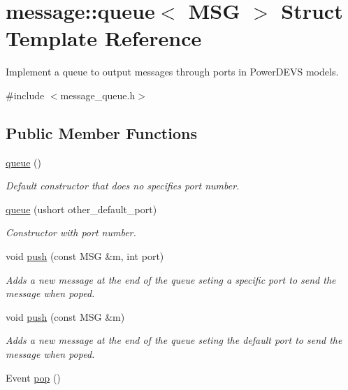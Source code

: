 \hypertarget{classmessage_1_1queue}{}\section{message\+:\+:queue$<$ M\+SG $>$ Struct Template Reference}
\label{classmessage_1_1queue}


Implement a queue to output messages through ports in Power\+D\+E\+VS models.  




{\ttfamily \#include $<$message\+\_\+queue.\+h$>$}

\subsection*{Public Member Functions}
\begin{DoxyCompactItemize}
\item 
\hyperlink{classmessage_1_1queue_ac166e11137e5addc2f81b672c9b55c4d}{queue} ()
\begin{DoxyCompactList}\small\item\em Default constructor that does no specifies port number. \end{DoxyCompactList}\item 
\hyperlink{classmessage_1_1queue_a6d303f8450ddfc4f1cffd80e94e25f0a}{queue} (ushort other\+\_\+default\+\_\+port)
\begin{DoxyCompactList}\small\item\em Constructor with port number. \end{DoxyCompactList}\item 
void \hyperlink{classmessage_1_1queue_ab4afb64536817a390af8348866136822}{push} (const M\+SG \&m, int port)
\begin{DoxyCompactList}\small\item\em Adds a new message at the end of the queue seting a specific port to send the message when poped. \end{DoxyCompactList}\item 
void \hyperlink{classmessage_1_1queue_a6672a6c6f964beaadf2594d0e7ca56c2}{push} (const M\+SG \&m)
\begin{DoxyCompactList}\small\item\em Adds a new message at the end of the queue seting the default port to send the message when poped. \end{DoxyCompactList}\item 
Event \hyperlink{classmessage_1_1queue_a8ebd25ce589eca4dd4b1afde687df705}{pop} ()

\end{DoxyCompactItemize}
